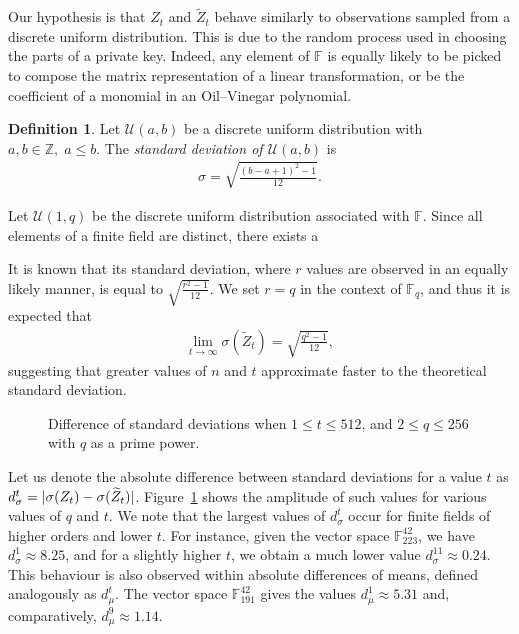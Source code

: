 \documentclass[12pt, a4paper, oneside]{memoir}
\DeclarePairedDelimiter\abs{\lvert}{\rvert}
\theoremstyle{definition}
\newtheorem{definition}[theorem]{Definition}
\begin{document}
Our hypothesis is that $Z_{t}$ and $\widetilde{Z}_{t}$ behave similarly to observations sampled from a discrete uniform distribution. This is due to the random process used in choosing the parts of a private key. Indeed, any element of $\mathbb{F}$ is equally likely to be picked to compose the matrix representation of a linear transformation, or be the coefficient of a monomial in an Oil--Vinegar polynomial.

\begin{definition}
  Let $\mathcal{U}(a, b)$ be a discrete uniform distribution with $a, b \in \mathbb{Z},\; a \leq b$. The \emph{standard deviation of $\mathcal{U}(a, b)$} is
  \begin{align}
    \sigma = \sqrt{\frac{(b - a + 1)^{2} - 1}{12}}.
  \end{align}
\end{definition}

Let $\mathcal{U}(1, q)$ be the discrete uniform distribution associated with $\mathbb{F}$. Since all elements of a finite field are distinct, there exists a 

It is known that its
standard deviation, where $r$ values are observed in an equally likely manner,
is equal to $\sqrt{\frac{r^{2} - 1}{12}}$. We set $r = q$ in the context of $\mathbb{F}_{q}$, and thus it is expected that
\begin{align}
  \lim_{t \to \infty} \sigma(\widetilde{Z}_{t}) = \sqrt{\frac{q^{2} - 1}{12}},
\end{align}
suggesting that greater values of $n$ and $t$ approximate faster to the
theoretical standard deviation.

\begin{figure}[ht]
  \subfloat[
    $d_{\sigma}^{t}$ for $n = 42, v_{1} = 17$.\label{fig:2a}
  ]{
  }
  \subfloat[
    $d_{\sigma}^{t}$ for $n = 90, v_{1} = 35$.\label{fig:2b}
  ]{
  }
  \caption{Difference of standard deviations when $1 \leq t \leq 512$,
    and $2 \leq q \leq 256$ with $q$ as a prime power.}\label{fig:2}
\end{figure}

Let us denote the absolute difference between standard deviations for a value
$t$ as $d_{\sigma}^{t} = \abs{\sigma(Z_{t}) - \sigma(\widetilde{Z}_{t})}$.
Figure~\ref{fig:2} shows the amplitude of such values for various values of $q$
and $t$. We note that the largest values of $d_{\sigma}^{t}$ occur for finite
fields of higher orders and lower $t$. For instance, given the vector space
$\mathbb{F}_{223}^{42}$, we have $d_{\sigma}^{1} \approx 8.25$, and for a
slightly higher $t$, we obtain a much lower value
$d_{\sigma}^{11} \approx 0.24$. This behaviour is also observed within absolute
differences of means, defined analogously as $d_{\mu}^{t}$. The vector space
$\mathbb{F}_{191}^{42}$ gives the values $d_{\mu}^{1} \approx 5.31$ and,
comparatively, $d_{\mu}^{9} \approx 1.14$.
\end{document}
